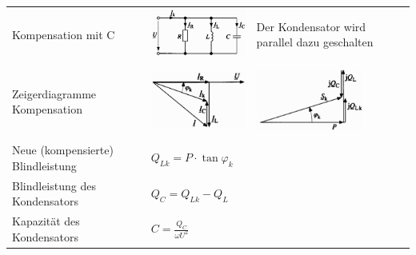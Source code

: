 
\begin{tabular}{p{7cm}p{4.5cm}p{5cm}}
	Kompensation mit C &
    	\begin{minipage}{4cm}
        	\includegraphics[width=3.5cm]{bilder/Parallelkompensation.png}
        \end{minipage} & 
		Der Kondensator wird parallel dazu geschalten \\ \\
	Zeigerdiagramme Kompensation &
		\begin{minipage}{4.5cm}
        	\includegraphics[width=3.5cm]{bilder/Blindstromkompensation.png}
        \end{minipage} &
		\begin{minipage}{4.5cm}
        	\includegraphics[width=3.5cm]{bilder/Blindleistungskompensation.png}
        \end{minipage} \\ \\
	Neue (kompensierte) Blindleistung &
		$Q_{Lk} = P \cdot \tan{\varphi_k}$ \\
	Blindleistung des Kondensators &
		$Q_C = Q_{Lk} - Q_L$ \\
	Kapazität des Kondensators &
		$C = \frac{Q_C}{\omega U^2}$ \\	
	\end{tabular}